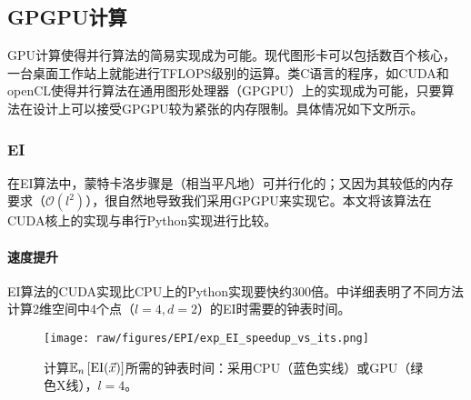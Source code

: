 \documentclass[index]{subfiles}
\begin{document}
\subsection{GPGPU计算} %
\label{sec:GPGPU Computing}

GPU计算使得并行算法的简易实现成为可能。现代图形卡可以包括数百个核心，一台桌面工作站上就能进行TFLOPS级别的运算。类C语言的程序，如CUDA和openCL使得并行算法在通用图形处理器（GPGPU）上的实现成为可能，只要算法在设计上可以接受GPGPU较为紧张的内存限制。具体情况如下文所示。

\subsubsection{EI}
\label{GPUEI}

在EI算法中，蒙特卡洛步骤是（相当平凡地）可并行化的；又因为其较低的内存要求（$\mathcal{O}(l^{2})$），很自然地导致我们采用GPGPU来实现它。本文将该算法在CUDA核上的实现与串行Python实现进行比较。

%
%

\paragraph{速度提升}

EI算法的CUDA实现比CPU上的Python实现要快约300倍。中详细表明了不同方法计算2维空间中4个点（$l=4, d=2$）的EI时需要的钟表时间。

 \begin{figure}[hpt]
 	\centerline{\texttt{[image: raw/figures/EPI/exp\_EI\_speedup\_vs\_its.png]}}
    \caption[CPU和GPU计算EI的时间消耗]{计算$\mathbb{E}_{n}\left[{\rm EI}(\vec{x})\right]$所需的钟表时间：采用CPU（蓝色实线）或GPU（绿色X线），$l = 4$。}
 	\label{GPUspeed1}
 \end{figure}

%
%
\end{document}

